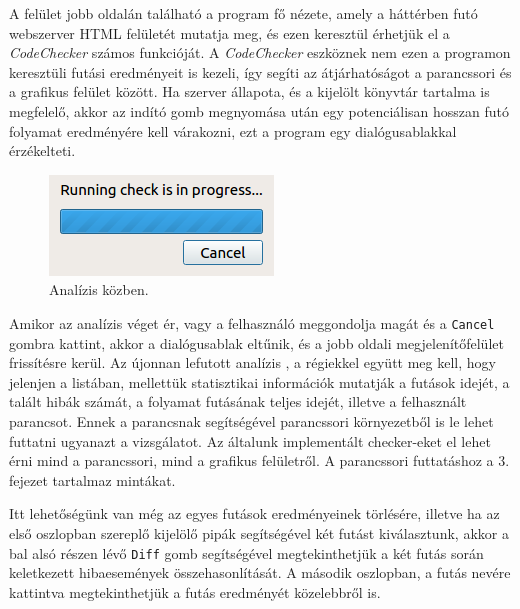 \documentclass[a4paper,12pt]{report}
\begin{document}
A felület jobb oldalán található a program fő nézete, amely a háttérben futó webszerver HTML felületét mutatja meg, és ezen keresztül érhetjük el a \emph{CodeChecker} számos funkcióját. A \emph{CodeChecker} eszköznek nem ezen a programon keresztüli futási eredményeit is kezeli, így segíti az átjárhatóságot a parancssori és a grafikus felület között. Ha szerver állapota, és a kijelölt könyvtár tartalma is megfelelő, akkor az indító gomb megnyomása után egy potenciálisan hosszan futó folyamat eredményére kell várakozni, ezt a program egy dialógusablakkal érzékelteti.

\begin{figure}[h]
\caption{Analízis közben.}
\centering
\includegraphics[scale=0.8]{progress_bar.png}
\end{figure}

Amikor az analízis véget ér, vagy a felhasználó meggondolja magát és a \texttt{Cancel} gombra kattint, akkor a dialógusablak eltűnik, és a jobb oldali megjelenítőfelület frissítésre kerül. Az újonnan lefutott analízis , a régiekkel együtt meg kell, hogy jelenjen a listában, mellettük statisztikai információk mutatják a futások idejét, a talált hibák számát, a folyamat futásának teljes idejét, illetve a felhasznált parancsot. Ennek a parancsnak segítségével parancssori környezetből is le lehet futtatni ugyanazt a vizsgálatot. Az általunk implementált checker-eket el lehet érni mind a parancssori, mind a grafikus felületről. A parancssori futtatáshoz a 3. fejezet tartalmaz mintákat. 

Itt lehetőségünk van még az egyes futások eredményeinek törlésére, illetve ha az első oszlopban szereplő kijelölő pipák segítségével két futást kiválasztunk, akkor a bal alsó részen lévő \texttt{Diff} gomb segítségével megtekinthetjük a két futás során keletkezett hibaesemények összehasonlítását. A második oszlopban, a futás nevére kattintva megtekinthetjük a futás eredményét közelebbről is.
\end{document}
